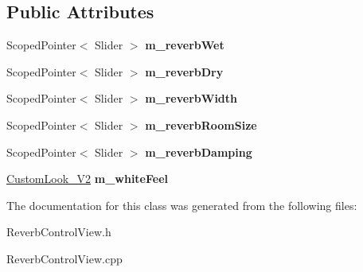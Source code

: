 \subsection*{Public Attributes}
\begin{DoxyCompactItemize}
\item 
Scoped\+Pointer$<$ Slider $>$ {\bfseries m\+\_\+reverb\+Wet}\hypertarget{class_reverb_control_view_adb06f684c3400107121e590d7b4d0e2a}{}\label{class_reverb_control_view_adb06f684c3400107121e590d7b4d0e2a}

\item 
Scoped\+Pointer$<$ Slider $>$ {\bfseries m\+\_\+reverb\+Dry}\hypertarget{class_reverb_control_view_ade73bcb573e3d82e4f6cc38458d7ab17}{}\label{class_reverb_control_view_ade73bcb573e3d82e4f6cc38458d7ab17}

\item 
Scoped\+Pointer$<$ Slider $>$ {\bfseries m\+\_\+reverb\+Width}\hypertarget{class_reverb_control_view_a0c73bb4e9bdee45502366a2022ba44d1}{}\label{class_reverb_control_view_a0c73bb4e9bdee45502366a2022ba44d1}

\item 
Scoped\+Pointer$<$ Slider $>$ {\bfseries m\+\_\+reverb\+Room\+Size}\hypertarget{class_reverb_control_view_ab9271535e50ba011a55e821b57825c6e}{}\label{class_reverb_control_view_ab9271535e50ba011a55e821b57825c6e}

\item 
Scoped\+Pointer$<$ Slider $>$ {\bfseries m\+\_\+reverb\+Damping}\hypertarget{class_reverb_control_view_adcf0bb55e1005d360e33a4862eb317a8}{}\label{class_reverb_control_view_adcf0bb55e1005d360e33a4862eb317a8}

\item 
\hyperlink{class_custom_look___v2}{Custom\+Look\+\_\+\+V2} {\bfseries m\+\_\+white\+Feel}\hypertarget{class_reverb_control_view_a16fafa4d619afba197ffdd0557e10663}{}\label{class_reverb_control_view_a16fafa4d619afba197ffdd0557e10663}

\end{DoxyCompactItemize}


The documentation for this class was generated from the following files\+:\begin{DoxyCompactItemize}
\item 
Reverb\+Control\+View.\+h\item 
Reverb\+Control\+View.\+cpp\end{DoxyCompactItemize}
